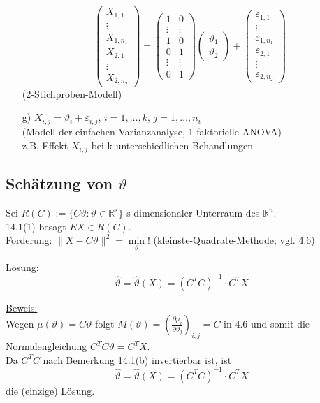 \documentclass[a4paper,11pt,twoside,titlepage]{article}
\newcommand{\R}{{\mathbb R}}
\begin{document}
\begin{itemize}
\[\begin{pmatrix} X_{1,1}\\\vdots\\X_{1,n_1}\\X_{2,1}\\\vdots\\X_{2,n_2}\end{pmatrix}=\begin{pmatrix}1&0\\\vdots&\vdots\\1&0\\0&1\\\vdots&\vdots\\0&1\end{pmatrix}\begin{pmatrix} \vartheta_1\\\vartheta_2\end{pmatrix}+\begin{pmatrix}\varepsilon_{1,1}\\\vdots\\\varepsilon_{1,n_1}\\\varepsilon_{2,1}\\\vdots\\\varepsilon_{2,n_2}\end{pmatrix}\]
(2-Stichproben-Modell)
\item[g) ]$X_{i,j}=\vartheta_i+\varepsilon_{i,j}$, $i=1,\ldots,k$, $j=1,\ldots,n_i$\\
(Modell der einfachen Varianzanalyse, 1-faktorielle ANOVA)\\
z.B. Effekt $X_{i,j}$ bei k unterschiedlichen Behandlungen
\end{itemize}

\subsection{Schätzung von $\vartheta$}
Sei $R(C):=\{C\vartheta:\vartheta\in\R^s\}$ s-dimensionaler Unterraum des $\R^n$.\\
14.1(1) besagt $EX\in R(C)$.\\
Forderung: $\|X-C\vartheta\|^2=\min\limits_\vartheta!$ (kleinste-Quadrate-Methode; vgl. 4.6)

\underline{Lösung:}
\[\hat\vartheta=\hat\vartheta(X)=(C^TC)^{-1}\cdot C^TX\]

\underline{Beweis:}\\
Wegen $\mu(\vartheta)=C\vartheta$ folgt $M(\vartheta)=\left(\frac{\partial\mu_i}{\partial\vartheta_j}\right)_{i,j}=C$ in 4.6 und somit die Normalengleichung $C^TC\vartheta=C^TX$.\\
Da $C^TC$ nach Bemerkung 14.1(b) invertierbar ist, ist 
\[\hat\vartheta=\hat\vartheta(X)=(C^TC)^{-1}\cdot C^TX\]
die (einzige) Lösung.
\end{document}
